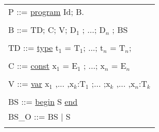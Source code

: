 {
\fontsize{9pt}{10}\selectfont
\ttfamily
\begin{tabular}{ll}
\multicolumn{2}{l}{P ::= \underline{program} Id; B.}\\\\

\multicolumn{2}{l}{B ::= TD; C; V; D$_1$ ; ...; D$_n$ ; BS}\\\\

\multicolumn{2}{l}{TD ::= \underline{type} t$_1$ = T$_1$; ...; t$_n$ = T$_n$;}\\\\

\multicolumn{2}{l}{C ::= \underline{const} x$_1$ = E$_1$ ; ...; x$_n$ = E$_n$}\\\\

\multicolumn{2}{l}{V ::= \underline{var} x$_1$ ,... ,x$_k$:T$_1$ ;... ;x$_k$ ,... ,x$_n$:T$_k$}\\\\

\multicolumn{2}{l}{BS ::= \underline{begin} S \underline{end}}\\

\multicolumn{2}{l}{BS\_O ::= BS | S}\\\\


\end{tabular}}
